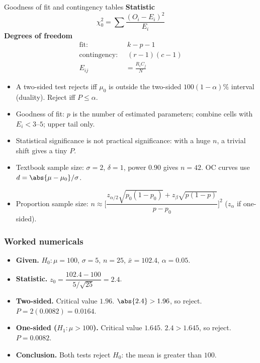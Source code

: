 \begin{formulabox}{Goodness of fit and contingency tables}
\textbf{Statistic}
\[ \chi_0^2=\sum\frac{(O_i-E_i)^2}{E_i} \]
\textbf{Degrees of freedom}
\[ \begin{aligned}\text{fit: }&\ k-p-1\\ \text{contingency: }&\ (r-1)(c-1)\\ E_{ij}&=\frac{R_iC_j}{N}\end{aligned} \]
\end{formulabox}

\begin{notebox}
\begin{itemize}
  \item A two-sided test rejects iff $\mu_0$ is outside the two-sided $100(1-\alpha)\%$ interval (duality). Reject iff $P\le\alpha$.
  \item Goodness of fit: $p$ is the number of estimated parameters; combine cells with $E_i<3$--$5$; upper tail only.
  \item Statistical significance is not practical significance: with a huge $n$, a trivial shift gives a tiny $P$.
  \item Textbook sample size: $\sigma=2$, $\delta=1$, power $0.90$ gives $n=42$. OC curves use $d=\abs{\mu-\mu_0}/\sigma$.
  \item Proportion sample size: $n\approx\Big[\dfrac{z_{\alpha/2}\sqrt{p_0(1-p_0)}+z_\beta\sqrt{p(1-p)}}{p-p_0}\Big]^2$ ($z_\alpha$ if one-sided).
\end{itemize}
\end{notebox}

\subsubsection*{Worked numericals}

\begin{example}
\begin{itemize}
  \item \textbf{Given.} $H_0:\mu=100$, $\sigma=5$, $n=25$, $\bar{x}=102.4$, $\alpha=0.05$.
  \item \textbf{Statistic.} $z_0=\dfrac{102.4-100}{5/\sqrt{25}}=2.4$.
  \item \textbf{Two-sided.} Critical value $1.96$. $\abs{2.4}>1.96$, so reject. $P=2(0.0082)=0.0164$.
  \item \textbf{One-sided ($H_1:\mu>100$).} Critical value $1.645$. $2.4>1.645$, so reject. $P=0.0082$.
  \item \textbf{Conclusion.} Both tests reject $H_0$: the mean is greater than $100$.
\end{itemize}
\end{example}

